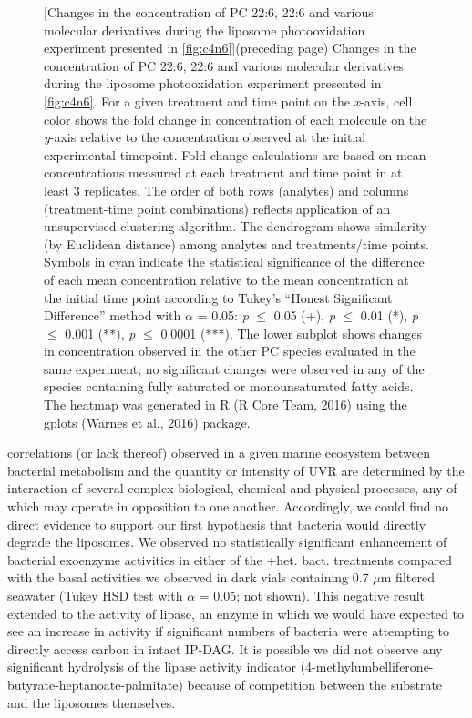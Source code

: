 \begin{figure} [!t]
[Changes in the concentration of PC 22:6, 22:6 and various molecular derivatives during the liposome photooxidation experiment presented in \autoref{fig:c4n6}]{(preceding page) Changes in the concentration of PC 22:6, 22:6 and various molecular derivatives during the liposome photooxidation experiment presented in \autoref{fig:c4n6}. For a given treatment and time point on the \emph{x}-axis, cell color shows the fold change in concentration of each molecule on the \emph{y}-axis relative to the concentration observed at the initial experimental timepoint. Fold-change calculations are based on mean concentrations measured at each treatment and time point in at least 3 replicates. The order of both rows (analytes) and columns (treatment-time point combinations) reflects application of an unsupervised clustering algorithm. The dendrogram shows similarity (by Euclidean distance) among analytes and treatments/time points. Symbols in cyan indicate the statistical significance of the difference of each mean concentration relative to the mean concentration at the initial time point according to Tukey's ``Honest Significant Difference'' method with $\alpha$ = 0.05: \emph{p} $\leq$ 0.05 (+), \emph{p} $\leq$ 0.01 (*), \emph{p} $\leq$ 0.001 (**), \emph{p} $\leq$ 0.0001 (***). The lower subplot shows changes in concentration observed in the other PC species evaluated in the same experiment; no significant changes were observed in any of the species containing fully saturated or monounsaturated fatty acids. The heatmap was generated in R (R Core Team, 2016) using the gplots (Warnes et al., 2016) package.}
\label{fig:c4n7}
\end{figure}correlations (or lack thereof) observed in a given marine ecosystem between bacterial metabolism and the quantity or intensity of UVR are determined by the interaction of several complex biological, chemical and physical processes, any of which may operate in opposition to one another. Accordingly, we could find no direct evidence to support our first hypothesis that bacteria would directly degrade the liposomes. We observed no statistically significant enhancement of bacterial exoenzyme activities in either of the +het. bact. treatments compared with the basal activities we observed in dark vials containing 0.7 $\mu$m filtered seawater (Tukey HSD test with $\alpha$ = 0.05; not shown). This negative result extended to the activity of lipase, an enzyme in which we would have expected to see an increase in activity if significant numbers of bacteria were attempting to directly access carbon in intact IP-DAG. It is possible we did not observe any significant hydrolysis of the lipase activity indicator (4-methylumbelliferone-butyrate-heptanoate-palmitate) because of competition between the substrate and the liposomes themselves.


